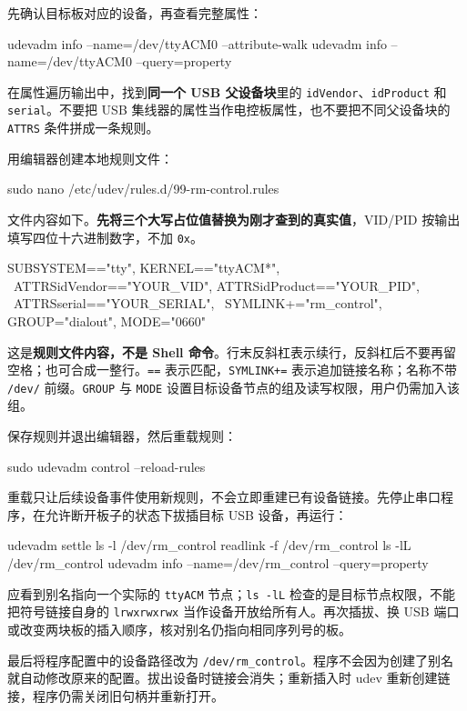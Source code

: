 \begin{example}[识别目标板并写入规则]
先确认目标板对应的设备，再查看完整属性：


\begin{tbash}
udevadm info --name=/dev/ttyACM0 --attribute-walk
udevadm info --name=/dev/ttyACM0 --query=property
\end{tbash}


在属性遍历输出中，找到\textbf{同一个 USB 父设备块}里的 \texttt{idVendor}、\texttt{idProduct} 和 \texttt{serial}。不要把 USB 集线器的属性当作电控板属性，也不要把不同父设备块的 \texttt{ATTRS} 条件拼成一条规则。

用编辑器创建本地规则文件：


\begin{tbash}
sudo nano /etc/udev/rules.d/99-rm-control.rules
\end{tbash}


文件内容如下。\textbf{先将三个大写占位值替换为刚才查到的真实值}，VID/PID 按输出填写四位十六进制数字，不加 \texttt{0x}。


\begin{tbash}
SUBSYSTEM=="tty", KERNEL=="ttyACM*", \
  ATTRS{idVendor}=="YOUR_VID", ATTRS{idProduct}=="YOUR_PID", \
  ATTRS{serial}=="YOUR_SERIAL", \
  SYMLINK+="rm_control", GROUP="dialout", MODE="0660"
\end{tbash}


这是\textbf{规则文件内容，不是 Shell 命令}。行末反斜杠表示续行，反斜杠后不要再留空格；也可合成一整行。\texttt{==} 表示匹配，\texttt{SYMLINK+=} 表示追加链接名称；名称不带 \texttt{/dev/} 前缀。\texttt{GROUP} 与 \texttt{MODE} 设置目标设备节点的组及读写权限，用户仍需加入该组。
\end{example}

\Needspace{8\baselineskip}
\begin{example}[重载、插拔并验证固定路径]
保存规则并退出编辑器，然后重载规则：


\begin{tbash}
sudo udevadm control --reload-rules
\end{tbash}


重载只让后续设备事件使用新规则，不会立即重建已有设备链接。先停止串口程序，在允许断开板子的状态下拔插目标 USB 设备，再运行：


\Needspace{9\baselineskip}
\begin{tbash}
udevadm settle
ls -l /dev/rm_control
readlink -f /dev/rm_control
ls -lL /dev/rm_control
udevadm info --name=/dev/rm_control --query=property
\end{tbash}


应看到别名指向一个实际的 \texttt{ttyACM} 节点；\texttt{ls -lL} 检查的是目标节点权限，不能把符号链接自身的 \texttt{lrwxrwxrwx} 当作设备开放给所有人。再次插拔、换 USB 端口或改变两块板的插入顺序，核对别名仍指向相同序列号的板。

最后将程序配置中的设备路径改为 \texttt{/dev/rm\_control}。程序不会因为创建了别名就自动修改原来的配置。拔出设备时链接会消失；重新插入时 udev 重新创建链接，程序仍需关闭旧句柄并重新打开。
\end{example}

